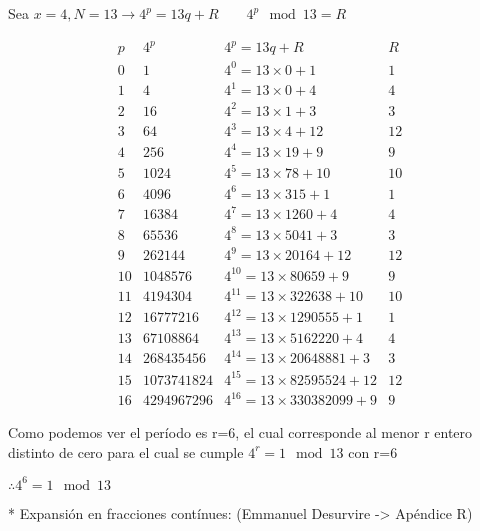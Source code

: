  Sea $x = 4, N = 13 \rightarrow 4^p = 13 q + R \qquad 4^p \mod 13 = R$

 \[\begin{matrix}
         p  &   4^p & 4^p = 13 q                         + R    &   R   \\
         0  &   1   & 4^0 = 13\times0                    + 1    & 1     \\
         1  &   4   & 4^1 = 13\times0                    + 4    & 4     \\
         2  &   16  & 4^2 = 13\times1                    + 3    & 3     \\
         3  &   64  & 4^3 = 13\times4                    + 12   & 12    \\
         4  &   256  & 4^4 = 13\times19                  + 9    & 9     \\
         5  &   1024  & 4^5 = 13\times78                 + 10   & 10    \\ %
         6  &   4096  & 4^6 = 13\times315                + 1    & 1     \\
         7  &   16384  & 4^7 = 13\times1260              + 4    & 4     \\
         8  &   65536  & 4^8 = 13\times5041              + 3    & 3     \\
         9  &   262144  & 4^9 = 13\times20164            + 12   & 12    \\
         10 &   1048576  & 4^10 = 13\times80659          + 9    & 9     \\
         11 &   4194304  & 4^11 = 13\times322638         + 10   & 10    \\
         12 &   16777216  & 4^12 = 13\times1290555       + 1    & 1     \\
         13 &   67108864  & 4^13 = 13\times5162220       + 4    & 4     \\
         14 &   268435456  & 4^14 = 13\times20648881     + 3    & 3     \\
         15 &   1073741824  & 4^15 = 13\times82595524    + 12   & 12    \\
         16 &   4294967296  & 4^16 = 13\times330382099   + 9    & 9     
     \end{matrix}
 \]

 Como podemos ver el período es r=6, el cual corresponde al menor r entero distinto de cero para el cual se cumple $4^r=1 \mod 13$ con r=6

 $\therefore 4^6 = 1 \mod 13$

* Expansión en fracciones contínues: (Emmanuel Desurvire -> Apéndice R)

